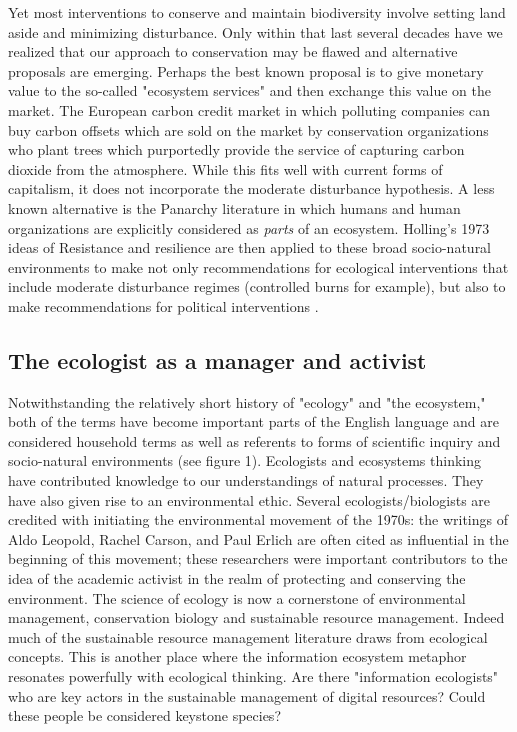 Yet most interventions to conserve and maintain biodiversity involve setting land aside and minimizing disturbance. Only within that last several decades have we realized that our approach to conservation may be flawed and alternative proposals are emerging. Perhaps the best known proposal is to give monetary value to the so-called "ecosystem services" and then exchange this value on the market. The European carbon credit market in which polluting companies can buy carbon offsets which are sold on the market by conservation organizations who plant trees which purportedly provide the service of capturing carbon dioxide from the atmosphere. While this fits well with current forms of capitalism, it does not incorporate the moderate disturbance hypothesis. A less known alternative is the Panarchy literature in which humans and human organizations are explicitly considered as \textit{parts} of an ecosystem. Holling's 1973 ideas of Resistance and resilience are then applied to these broad socio-natural environments to make not only recommendations for ecological interventions that include moderate disturbance regimes (controlled burns for example), but also to make recommendations for political interventions \citep{holling_2002}.

\subsection{The ecologist as a manager and activist}

 Notwithstanding the relatively short history of "ecology" and "the ecosystem," both of the terms have become important parts of the English language and are considered household terms as well as referents to forms of scientific inquiry and socio-natural environments (see figure 1). Ecologists and ecosystems thinking have contributed knowledge to our understandings of natural processes. They have also given rise to an environmental ethic. Several ecologists/biologists are credited with initiating the environmental movement of the 1970s: the writings of Aldo Leopold, Rachel Carson, and Paul Erlich are often cited as influential in the beginning of this movement; these researchers were important contributors to the idea of the academic activist in the realm of protecting and conserving the environment. The science of ecology is now a cornerstone of environmental management, conservation biology and sustainable resource management. Indeed much of the sustainable resource management literature draws from ecological concepts.  This is another place where the information ecosystem metaphor resonates powerfully with ecological thinking. Are there "information ecologists" who are key actors in the sustainable management of digital resources? Could these people be considered keystone species?
 
